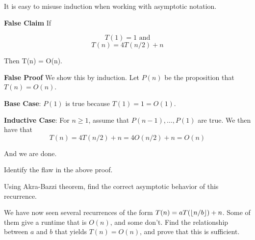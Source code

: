 \documentclass[12pt,twoside]{article}
\begin{document}
\begin{problem}{20}
It is easy to misuse induction when working with asymptotic notation.

\textbf{False Claim}  If

$$T(1) = 1 \textrm{ and}$$
$$T(n) = 4T(n/2) + n$$

Then T(n) = O(n).

\textbf{False Proof}
We show this by induction.  Let $P(n)$ be the proposition that $T(n) = O(n)$.  

\textbf{Base Case}:
$P(1)$ is true because $T(1) = 1 = O(1)$. 

\textbf{Inductive Case}: 
For $n \geq 1$, assume that $P(n-1), \ldots, P(1)$ are true.  We then have that
$$T(n) = 4T(n/2) + n = 4O(n/2) + n = O(n)$$

And we are done.

\bparts
	 Identify the flaw in the above proof.  
		
	 Using Akra-Bazzi theorem, find the correct asymptotic behavior of this recurrence.
	
	 We have now seen several recurrences of the form $T(n) = aT(\left\lfloor n/b\right\rfloor) + n$.  Some of them give a runtime that is $O(n)$, and some don't.  Find the relationship
	between $a$ and $b$ that yields $T(n) = O(n)$, and prove that this is sufficient.
	
\eparts
\end{problem}
\end{document}
